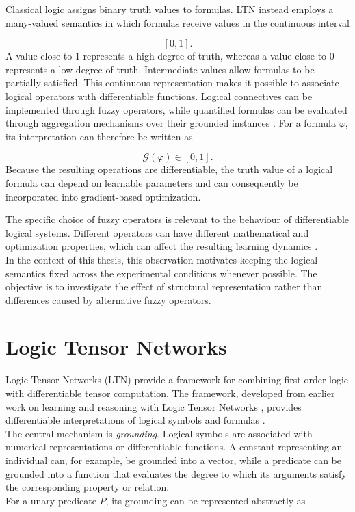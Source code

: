 \noindent
Classical logic assigns binary truth values to formulas. LTN instead employs a many-valued semantics in which formulas receive values in the continuous interval

$$
[0,1].
$$
\noindent
A value close to $1$ represents a high degree of truth, whereas a value close to $0$ represents a low degree of truth. Intermediate values allow formulas to be partially satisfied.
\noindent
This continuous representation makes it possible to associate logical operators with differentiable functions. Logical connectives can be implemented through fuzzy operators, while quantified formulas can be evaluated through aggregation mechanisms over their grounded instances \cite{badreddine2022logic}.
\noindent
For a formula $\varphi$, its interpretation can therefore be written as

$$
\mathcal{G}(\varphi) \in [0,1].
$$
\noindent 
Because the resulting operations are differentiable, the truth value of a logical formula can depend on learnable parameters and can consequently be incorporated into gradient-based optimization.

\noindent
The specific choice of fuzzy operators is relevant to the behaviour of differentiable logical systems. Different operators can have different mathematical and optimization properties, which can affect the resulting learning dynamics \cite{vankrieken2022fuzzy}.
\noindent \\
In the context of this thesis, this observation motivates keeping the logical semantics fixed across the experimental conditions whenever possible. The objective is to investigate the effect of structural representation rather than differences caused by alternative fuzzy operators.

\section{Logic Tensor Networks}

\noindent
Logic Tensor Networks (LTN) provide a framework for combining first-order logic with differentiable tensor computation. The framework, developed from earlier work on learning and reasoning with Logic Tensor Networks \cite{serafini2016learning}, provides differentiable interpretations of logical symbols and formulas \cite{badreddine2022logic}.
\noindent\\
The central mechanism is \textit{grounding}. Logical symbols are associated with numerical representations or differentiable functions. A constant representing an individual can, for example, be grounded into a vector, while a predicate can be grounded into a function that evaluates the degree to which its arguments satisfy the corresponding property or relation.
\noindent\\
For a unary predicate $P$, its grounding can be represented abstractly as

